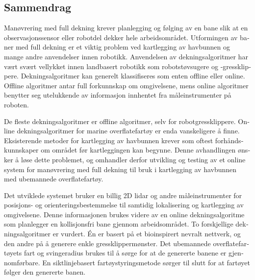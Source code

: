 \begin{otherlanguage}{norsk}


\section*{Sammendrag\\[2ex]\large{}}
\thispagestyle{plain}

\noindent Manøvrering med full dekning krever planlegging og følging av en bane slik at en observasjonssensor eller robotdel dekker hele arbeidsområdet. Utformingen av baner med full dekning er et viktig problem ved kartlegging av havbunnen og mange andre anvendelser innen robotikk. Anvendelsen av dekningsalgoritmer har vært svært vellykket innen landbasert robotikk som robotstøvsugere og -gressklippere. Dekningsalgoritmer kan generelt klassifiseres som enten offline eller online. Offline algoritmer antar full forkunnskap om omgivelsene, mens online algoritmer benytter seg utelukkende av informasjon innhentet fra måleinstrumenter på roboten.

De fleste dekningsalgoritmer er offline algoritmer, selv for robotgressklippere. Online dekningsalgoritmer for marine overflatefartøy er enda vanskeligere å finne. Eksisterende metoder for kartlegging av havbunnen krever som oftest forhåndskunnskaper om området før kartleggingen kan begynne. Denne avhandlingen ønsker å løse dette problemet, og omhandler derfor utvikling og testing av et online system for manøvrering med full dekning til bruk i kartlegging av havbunnen med ubemannede overflatefartøy.

Det utviklede systemet bruker en billig 2D lidar og andre måle\-instru\-menter for posisjons- og orienteringsbestemmelse til samtidig lokalisering og kartlegging av omgivelsene. Denne informasjonen brukes videre av en online dekningsalgoritme som planlegger en kollisjonsfri bane gjennom arbeidsområdet. To forskjellige dekningsalgoritmer er vurdert. Én er basert på et bioinspirert nevralt nettverk, og den andre på å generere enkle gressklippermønster. Det ubemannede overflatefartøyets fart og svingeradius brukes til å sørge for at de genererte banene er gjennomførbare. En siktlinjebasert fartøystyringsmetode sørger til slutt for at fartøyet følger den genererte banen.


\end{otherlanguage}
